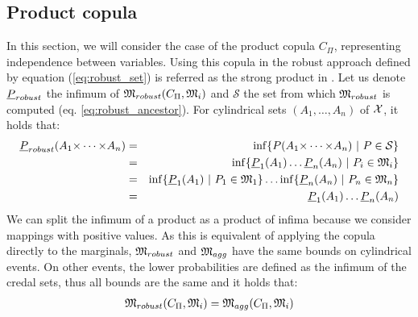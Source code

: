\subsection{Product copula}\label{subsection:product_copula}
In this section, we will consider the case of the product copula $C_\Pi$, representing independence between variables. Using this copula in the robust approach defined by equation (\ref{eq:robust_set}) is referred as the strong product in \cite{kacprzyk_factorisation_2010}. Let us denote ${\underline{P}}_{robust}$ the infimum of ${\mathfrak{M}}_{robust}(C_\Pi, {\mathfrak{M}}_i)$ and $\mathcal{S}$ the set from which ${\mathfrak{M}}_{robust}$ is computed (eq. \ref{eq:robust_ancestor}).
For cylindrical sets $(A_1, \dots, A_n)$ of ${\mathcal{X}}$, it holds that:
\begin{eqnarray*}
    {\underline{P}}_{robust}(A_1{\times\dots\times} A_n) &=& \inf\{P(A_1{\times\dots\times} A_n)~|~P\in\mathcal{S}\}\\
    &=&\inf\{{\underline{P}}_1(A_1)\dots{\underline{P}}_n(A_n)~|~P_i\in{\mathfrak{M}}_i\}\\
    &=&\inf\{{\underline{P}}_1(A_1)~|~P_1\in{\mathfrak{M}}_1\}\dots\inf\{{\underline{P}}_n(A_n)~|~P_n\in{\mathfrak{M}}_n\}\\
    &=&{\underline{P}}_1(A_1)\dots{\underline{P}}_n(A_n)
\end{eqnarray*}
We can split the infimum of a product as a product of infima because we consider mappings with positive values. As this is equivalent of applying the copula directly to the marginals, ${\mathfrak{M}}_{robust}$ and ${\mathfrak{M}}_{agg}$ have the same bounds on cylindrical events. On other events, the lower probabilities are defined as the infimum of the credal sets, thus all bounds are the same and it holds that:
\begin{eqnarray}
    {\mathfrak{M}}_{robust}(C_\Pi, {\mathfrak{M}}_i)={\mathfrak{M}}_{agg}(C_\Pi, {\mathfrak{M}}_i)
\end{eqnarray}


